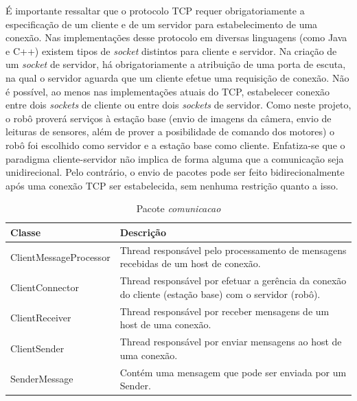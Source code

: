 É importante ressaltar que o protocolo TCP requer obrigatoriamente a especificação de um cliente e de um servidor para estabelecimento de uma conexão. Nas implementações desse protocolo em diversas linguagens (como Java e C++) existem tipos de \textit{socket} distintos para cliente e servidor. Na criação de um \textit{socket} de servidor, há obrigatoriamente a atribuição de uma porta de escuta, na qual o servidor aguarda que um cliente efetue uma requisição de conexão. Não é possível, ao menos nas implementações atuais do TCP, estabelecer conexão entre dois \textit{sockets} de cliente ou entre dois \textit{sockets} de servidor. Como neste projeto, o robô proverá serviços à estação base (envio de imagens da câmera, envio de leituras de sensores, além de prover a posibilidade de comando dos motores) o robô foi escolhido como servidor e a estação base como cliente. Enfatiza-se que o paradigma cliente-servidor não implica de forma alguma que a comunicação seja unidirecional. Pelo contrário, o envio de pacotes 
pode ser feito bidirecionalmente após uma conexão TCP ser estabelecida, sem nenhuma restrição quanto a isso.

\begin{table}[h]
  \centering
  \caption{Pacote \textit{comunicacao}}
  \begin{tabular}{p{6cm}p{8cm}}
    \toprule
    \textbf{Classe} & \textbf{Descrição} \\ 
    \midrule
    ClientMessageProcessor & Thread responsável pelo processamento de mensagens recebidas de um host de conexão. \\ \hline
    ClientConnector & Thread responsável por efetuar a gerência da conexão do cliente (estação base) com o servidor (robô). \\ \hline
    ClientReceiver & Thread responsável por receber mensagens de um host de uma conexão. \\ \hline
    ClientSender & Thread responsável por enviar mensagens ao host de uma conexão. \\ \hline
    SenderMessage & Contém uma mensagem que pode ser enviada por um Sender. \\ \hline
    \bottomrule
  \end{tabular}%
  \label{tab:pacote_comunicacao}%
\end{table}%

